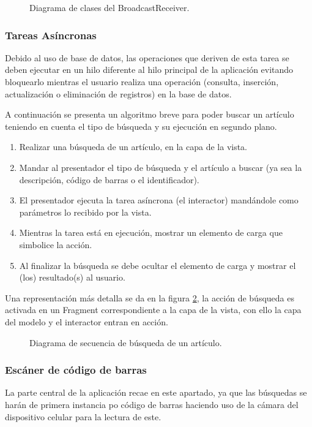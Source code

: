 \begin{figure}[h]
	\centering
	
	\caption{Diagrama de clases del BroadcastReceiver.}
	\label{diagrama:broadcast}
\end{figure}

\subsubsection{Tareas Asíncronas}

Debido al uso de base de datos, las operaciones que deriven de esta tarea se deben ejecutar en un hilo diferente al hilo principal de la aplicación evitando bloquearlo mientras el usuario realiza una operación (consulta, inserción, actualización o eliminación de registros) en la base de datos.

A continuación se presenta un algoritmo breve para poder buscar un artículo teniendo en cuenta el tipo de búsqueda y su ejecución en segundo plano.

\begin{enumerate}
	\item Realizar una búsqueda de un artículo, en la capa de la vista.
	\item Mandar al presentador el tipo de búsqueda y el artículo a buscar (ya sea la descripción, código de barras o el identificador).
	\item El presentador ejecuta la tarea asíncrona (el interactor) mandándole como parámetros lo recibido por la vista.
	\item Mientras la tarea está en ejecución, mostrar un elemento de carga que simbolice la acción.
	\item Al finalizar la búsqueda se debe ocultar el elemento de carga y mostrar el (los) resultado(s) al usuario.
\end{enumerate}

Una representación más detalla se da en la figura \ref{diagrama:busqueda_descripcion}, la acción de búsqueda es activada en un Fragment correspondiente a la capa de la vista, con ello la capa del modelo y el interactor entran en acción.

\begin{figure}[!h]
	\centering
	
	\caption{Diagrama de secuencia de búsqueda de un artículo.}
	\label{diagrama:busqueda_descripcion}
\end{figure}

\subsubsection{Escáner de código de barras}
La parte central de la aplicación recae en este apartado, ya que las búsquedas se harán de primera instancia po código de barras haciendo uso de la cámara del dispositivo celular para la lectura de este.

